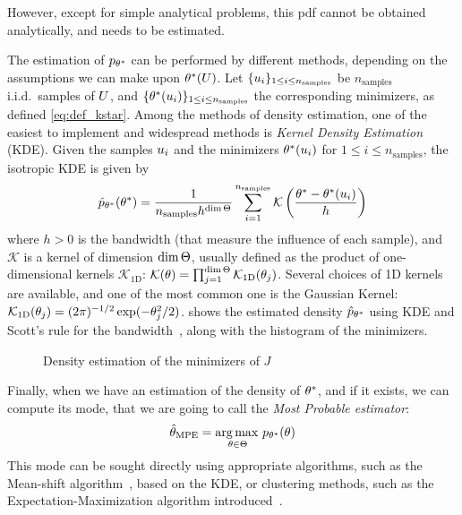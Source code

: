 \documentclass[../../Main_ManuscritThese.tex]{subfiles}
\newcommand\imgpath{/home/victor/acadwriting/Manuscrit/Text/Chapter3/img/}
\begin{document}
However, except for simple analytical problems, this pdf cannot be obtained analytically, and needs to be estimated.

The estimation of $p_{\theta^*}$ can be performed by different methods, depending on the assumptions we can make upon $\theta^*(U)$. Let $\{u_i\}_{1\leq i \leq n_{\mathrm{samples}}}$ be $n_{\mathrm{samples}}$ i.i.d.\ samples of $U$, and $\{\theta^*(u_i)\}_{1\leq i \leq n_{\mathrm{samples}}}$ the corresponding minimizers, as defined \cref{eq:def_kstar}. Among the methods of density estimation, one of the easiest to implement and widespread methods is \emph{Kernel Density Estimation} (KDE). 
Given the samples $u_i$  and the minimizers $\theta^*(u_i)$ for $1\leq i \leq n_{\mathrm{samples}}$, the isotropic KDE is given by
\begin{equation}
  \hat{p}_{\theta^*}(\theta^*) = \frac{1}{n_{\mathrm{samples}} h^{\dim \Theta}} \sum_{i=1}^{n_{\mathrm{samples}}} \mathcal{K}\left(\frac{\theta^* - \theta^*(u_i)}{h}\right)
\end{equation}
where $h>0$ is the bandwidth (that measure the influence of each sample), and $\mathcal{K}$ is a kernel of dimension $\dim \Theta$, usually defined as the product of one-dimensional kernels $\mathcal{K}_{1\mathrm{D}}$: $\mathcal{K}(\theta) = \prod_{j=1}^{\dim \Theta}\mathcal{K}_{1\mathrm{D}}(\theta_j)$. Several choices of 1D kernels are available, and one of the most common one is the Gaussian Kernel: $\mathcal{K}_{1\mathrm{D}}(\theta_j) = (2\pi)^{-1/2}\exp(-\theta_j^2 /2)$.  shows the estimated density $\hat{p}_{\theta^*}$ using KDE and Scott's rule for the bandwidth~\cite{scott_optimal_1979}, along with the histogram of the minimizers.


\begin{figure}[ht]
  \centering
  
  \caption{\label{fig:theta_star_samples} Density estimation of the minimizers of $J$}
\end{figure}

Finally, when we have an estimation of the density of $\theta^*$, and if it exists, we can compute its mode, that we are going to call the \emph{Most Probable estimator}:
\begin{equation}
  \hat{\theta}_{\mathrm{MPE}} = \operatorname*{arg\,max \,}_{\theta \in \Theta} p_{\theta^*}(\theta)
\end{equation}
This mode can be sought directly using appropriate algorithms, such as the Mean-shift algorithm~\cite{yizong_cheng_mean_1995}, based on the KDE, or clustering methods, such as the Expectation-Maximization algorithm introduced~\cite{dempster_maximum_1977}.
\end{document}
